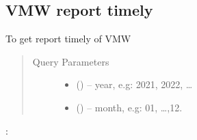 \documentclass[letterpaper,10pt,english,openany,oneside]{sphinxmanual}
\begin{document}
\subsection{VMW report timely}
\label{\detokenize{api-cmi/v1:vmw-report-timely}}

\begin{fulllineitems}
\label{\detokenize{api-cmi/v1:get--api-malaria-info-v1-Surveillance-vmw_report_timely}}
\sphinxAtStartPar
To get report timely of VMW
\begin{quote}\begin{description}
\item[{Query Parameters}] \leavevmode\begin{itemize}
\item {} 
\sphinxAtStartPar
{} () – year, e.g: 2021, 2022, …

\item {} 
\sphinxAtStartPar
{} () – month, e.g: 01, …,12.

\end{itemize}

\end{description}\end{quote}

\sphinxAtStartPar
{}:

\begin{sphinxVerbatim}[commandchars=\\\{\}]
   
   
   \PYG{p}{[}
           
           
           
           
           
           
  \PYG{p}{]}
\end{sphinxVerbatim}

\end{fulllineitems}
\end{document}

